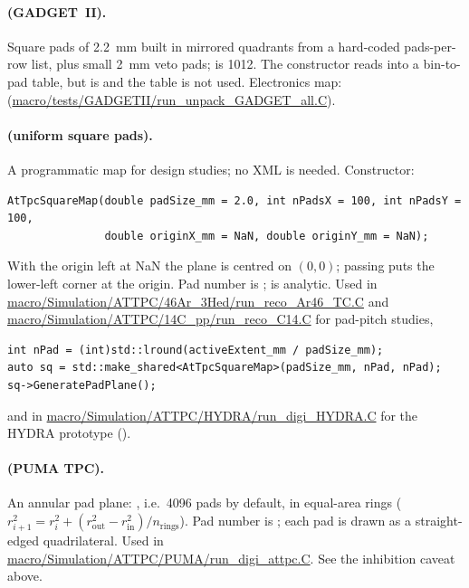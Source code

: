 \paragraph{ (GADGET~II).} Square pads of 2.2~mm built in mirrored quadrants from a
hard-coded pads-per-row list, plus small 2~mm veto pads;  is 1012. The constructor
reads  into a bin-to-pad table, but
 is  and the table is not used. Electronics map:
 (\url{macro/tests/GADGETII/run_unpack_GADGET_all.C}).

\paragraph{ (uniform square pads).} A programmatic map for design studies; no
XML is needed. Constructor:
\begin{verbatim}
AtTpcSquareMap(double padSize_mm = 2.0, int nPadsX = 100, int nPadsY = 100,
               double originX_mm = NaN, double originY_mm = NaN);
\end{verbatim}
With the origin left at NaN the plane is centred on $(0,0)$; passing  puts the lower-left
corner at the origin. Pad number is ;  is analytic. Used in
\url{macro/Simulation/ATTPC/46Ar_3Hed/run_reco_Ar46_TC.C} and
\url{macro/Simulation/ATTPC/14C_pp/run_reco_C14.C} for pad-pitch studies,
\begin{verbatim}
int nPad = (int)std::lround(activeExtent_mm / padSize_mm);
auto sq = std::make_shared<AtTpcSquareMap>(padSize_mm, nPad, nPad);
sq->GeneratePadPlane();
\end{verbatim}
and in \url{macro/Simulation/ATTPC/HYDRA/run_digi_HYDRA.C} for the HYDRA prototype
().

\paragraph{ (PUMA TPC).} An annular pad plane: , i.e.\ 4096 pads by default, in equal-area rings
($r_{i+1}^2 = r_i^2 + (r_\mathrm{out}^2 - r_\mathrm{in}^2)/n_\mathrm{rings}$). Pad number is
; each pad is drawn as a straight-edged quadrilateral. Used in
\url{macro/Simulation/ATTPC/PUMA/run_digi_attpc.C}. See the inhibition caveat above.


